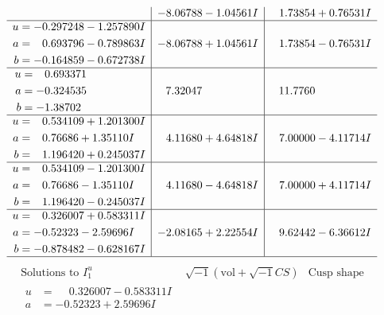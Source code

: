 \documentclass[1p]{elsarticle_modified}
\theoremstyle{definition}
\newcommand{\I}{\sqrt{-1}}
\begin{document}
$$\begin{array}{c|c|c}
 & -8.06788 - 1.04561 I & \phantom{-}1.73854 + 0.76531 I \\ \hline\begin{aligned}
u &= -0.297248 - 1.257890 I \\
a &= \phantom{-}0.693796 - 0.789863 I \\
b &= -0.164859 - 0.672738 I\end{aligned}
 & -8.06788 + 1.04561 I & \phantom{-}1.73854 - 0.76531 I \\ \hline\begin{aligned}
u &= \phantom{-}0.693371\phantom{ +0.000000I} \\
a &= -0.324535\phantom{ +0.000000I} \\
b &= -1.38702\phantom{ +0.000000I}\end{aligned}
 & \phantom{-}7.32047\phantom{ +0.000000I} & \phantom{-}11.7760\phantom{ +0.000000I} \\ \hline\begin{aligned}
u &= \phantom{-}0.534109 + 1.201300 I \\
a &= \phantom{-}0.76686 + 1.35110 I \\
b &= \phantom{-}1.196420 + 0.245037 I\end{aligned}
 & \phantom{-}4.11680 + 4.64818 I & \phantom{-}7.00000 - 4.11714 I \\ \hline\begin{aligned}
u &= \phantom{-}0.534109 - 1.201300 I \\
a &= \phantom{-}0.76686 - 1.35110 I \\
b &= \phantom{-}1.196420 - 0.245037 I\end{aligned}
 & \phantom{-}4.11680 - 4.64818 I & \phantom{-}7.00000 + 4.11714 I \\ \hline\begin{aligned}
u &= \phantom{-}0.326007 + 0.583311 I \\
a &= -0.52323 - 2.59696 I \\
b &= -0.878482 - 0.628167 I\end{aligned}
 & -2.08165 + 2.22554 I & \phantom{-}9.62442 - 6.36612 I\\
 \hline 
 \end{array}$$\newpage$$\begin{array}{c|c|c}  
\text{Solutions to }I^u_{1}& \I (\text{vol} + \sqrt{-1}CS) & \text{Cusp shape}\\
 \hline 
\begin{aligned}
u &= \phantom{-}0.326007 - 0.583311 I \\
a &= -0.52323 + 2.59696 I \\

\end{aligned}
\end{array}$$
\end{document}

